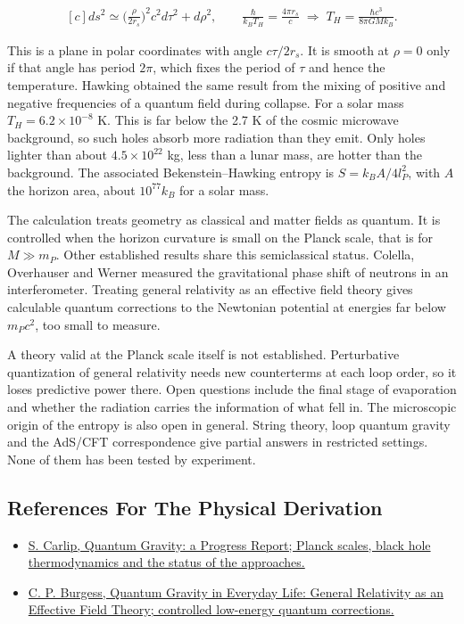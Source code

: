 \documentclass[11pt,oneside]{book}
\newenvironment{centeredalign}{\[\begin{gathered}[c]}{\end{gathered}\]}
\begin{document}
\begin{centeredalign}
ds^2\simeq\Big(\frac{\rho}{2r_s}\Big)^2c^2d\tau^2+d\rho^2,\qquad
\frac{\hbar}{k_BT_H}=\frac{4\pi r_s}{c}
\;\Rightarrow\; T_H=\frac{\hbar c^3}{8\pi GMk_B}.
\end{centeredalign}

This is a plane in polar coordinates with angle \(c\tau/2r_s\). It is smooth at \(\rho=0\) only if that angle has period \(2\pi\), which fixes the period of \(\tau\) and hence the temperature. Hawking obtained the same result from the mixing of positive and negative frequencies of a quantum field during collapse. For a solar mass \(T_H=6.2\times10^{-8}\) K. This is far below the 2.7 K of the cosmic microwave background, so such holes absorb more radiation than they emit. Only holes lighter than about \(4.5\times10^{22}\) kg, less than a lunar mass, are hotter than the background. The associated Bekenstein--Hawking entropy is \(S=k_BA/4l_P^2\), with \(A\) the horizon area, about \(10^{77}k_B\) for a solar mass.

The calculation treats geometry as classical and matter fields as quantum. It is controlled when the horizon curvature is small on the Planck scale, that is for \(M\gg m_P\). Other established results share this semiclassical status. Colella, Overhauser and Werner measured the gravitational phase shift of neutrons in an interferometer. Treating general relativity as an effective field theory gives calculable quantum corrections to the Newtonian potential at energies far below \(m_Pc^2\), too small to measure.

A theory valid at the Planck scale itself is not established. Perturbative quantization of general relativity needs new counterterms at each loop order, so it loses predictive power there. Open questions include the final stage of evaporation and whether the radiation carries the information of what fell in. The microscopic origin of the entropy is also open in general. String theory, loop quantum gravity and the AdS/CFT correspondence give partial answers in restricted settings. None of them has been tested by experiment.

\subsection*{References For The Physical Derivation}
\begin{itemize}
\item \href{https://arxiv.org/abs/gr-qc/0108040}{S. Carlip, Quantum Gravity: a Progress Report; Planck scales, black hole thermodynamics and the status of the approaches.}
\item \href{https://arxiv.org/abs/gr-qc/0311082}{C. P. Burgess, Quantum Gravity in Everyday Life: General Relativity as an Effective Field Theory; controlled low-energy quantum corrections.}
\end{itemize}
\end{document}

